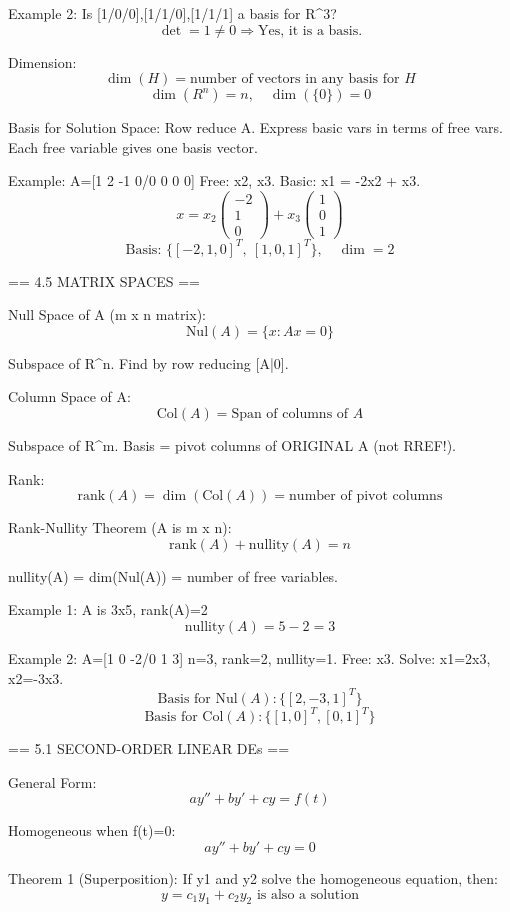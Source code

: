 Example 2: Is {[1/0/0],[1/1/0],[1/1/1]} a basis for R^3?
$$\det = 1 \neq 0 \Rightarrow \text{Yes, it is a basis.}$$

Dimension:
$$\dim(H) = \text{number of vectors in any basis for } H$$
$$\dim(R^n) = n, \quad \dim(\{0\}) = 0$$

Basis for Solution Space:
Row reduce A. Express basic vars in terms of free vars.
Each free variable gives one basis vector.

Example: A=[1 2 -1 0/0 0 0 0]
Free: x2, x3. Basic: x1 = -2x2 + x3.
$$x = x_2\begin{pmatrix}-2\\1\\0\end{pmatrix} + x_3\begin{pmatrix}1\\0\\1\end{pmatrix}$$
$$\text{Basis: } \{[-2,1,0]^T,\ [1,0,1]^T\}, \quad \dim = 2$$


== 4.5 MATRIX SPACES ==

Null Space of A (m x n matrix):
$$\text{Nul}(A) = \{x : Ax = 0\}$$

Subspace of R^n. Find by row reducing [A|0].

Column Space of A:
$$\text{Col}(A) = \text{Span of columns of } A$$

Subspace of R^m.
Basis = pivot columns of ORIGINAL A (not RREF!).

Rank:
$$\text{rank}(A) = \dim(\text{Col}(A)) = \text{number of pivot columns}$$

Rank-Nullity Theorem (A is m x n):
$$\text{rank}(A) + \text{nullity}(A) = n$$

nullity(A) = dim(Nul(A)) = number of free variables.

Example 1: A is 3x5, rank(A)=2
$$\text{nullity}(A) = 5 - 2 = 3$$

Example 2: A=[1 0 -2/0 1 3]
n=3, rank=2, nullity=1.
Free: x3. Solve: x1=2x3, x2=-3x3.
$$\text{Basis for Nul}(A): \{[2,-3,1]^T\}$$
$$\text{Basis for Col}(A): \{[1,0]^T, [0,1]^T\}$$


== 5.1 SECOND-ORDER LINEAR DEs ==

General Form:
$$ay'' + by' + cy = f(t)$$

Homogeneous when f(t)=0:
$$ay'' + by' + cy = 0$$

Theorem 1 (Superposition):
If y1 and y2 solve the homogeneous equation, then:
$$y = c_1y_1 + c_2y_2 \text{ is also a solution}$$

